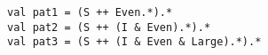 \begin{lstlisting}[style=reclojureScala]
val pat1 = (S ++ Even.*).*
val pat2 = (S ++ (I & Even).*).*
val pat3 = (S ++ (I & Even & Large).*).*
\end{lstlisting}
